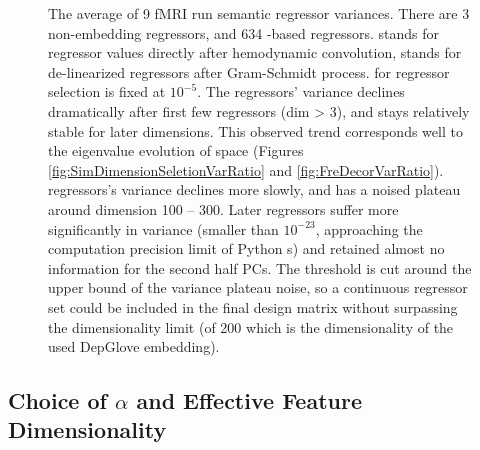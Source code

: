 \begin{figure}
    \centering
    \caption[French  Regressor Variances]{The average of 9 fMRI run semantic regressor variances. There are 3 non-embedding regressors, and 634 -based regressors.  stands for regressor values directly after hemodynamic convolution,  stands for de-linearized regressors after Gram-Schmidt process.  for regressor selection is fixed at \(10^{-5}\). The  regressors' variance declines dramatically after first few  regressors (dim > 3), and stays relatively stable for later dimensions. This observed trend corresponds well to the eigenvalue evolution of  space (Figures \ref{fig:SimDimensionSeletionVarRatio} and \ref{fig:FreDecorVarRatio}).  regressors's variance declines more slowly, and has a noised plateau around dimension 100 -- 300. Later regressors suffer more significantly in variance (smaller than \(10^{-23}\), approaching the computation precision limit of Python s) and retained almost no information for the second half PCs. The threshold is cut around the upper bound of the  variance plateau noise, so a continuous regressor set could be included in the final design matrix without surpassing the dimensionality limit (of 200 which is the dimensionality of the used DepGlove embedding).} 
    \label{fig:freSIMRegVar}
\end{figure}


\subsection{Choice of \(\alpha\) and Effective Feature Dimensionality}

